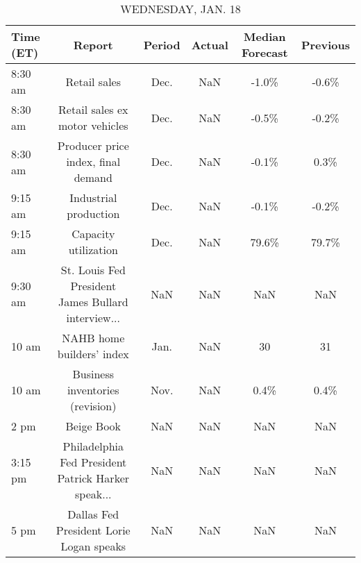 \documentclass{article}%
\begin{document}
\begin{table}[htbp]%
\caption{WEDNESDAY, JAN. 18}%
\centering%
\begin{adjustbox}{width=1\textwidth}%
\begin{tabular}{lccccc}
\toprule
Time (ET) &                                             Report & Period & Actual & Median Forecast & Previous \\
\midrule
  8:30 am &                                       Retail sales &   Dec. &    NaN &           -1.0\% &    -0.6\% \\
  8:30 am &                     Retail sales ex motor vehicles &   Dec. &    NaN &           -0.5\% &    -0.2\% \\
  8:30 am &                 Producer price index, final demand &   Dec. &    NaN &           -0.1\% &     0.3\% \\
  9:15 am &                              Industrial production &   Dec. &    NaN &           -0.1\% &    -0.2\% \\
  9:15 am &                               Capacity utilization &   Dec. &    NaN &           79.6\% &    79.7\% \\
  9:30 am & St. Louis Fed President James Bullard interview... &    NaN &    NaN &             NaN &      NaN \\
    10 am &                          NAHB home builders' index &   Jan. &    NaN &              30 &       31 \\
    10 am &                    Business inventories (revision) &   Nov. &    NaN &            0.4\% &     0.4\% \\
     2 pm &                                         Beige Book &    NaN &    NaN &             NaN &      NaN \\
  3:15 pm & Philadelphia Fed President Patrick Harker speak... &    NaN &    NaN &             NaN &      NaN \\
     5 pm &            Dallas Fed President Lorie Logan speaks &    NaN &    NaN &             NaN &      NaN \\
\bottomrule
\end{tabular}
%
\end{adjustbox}%
\end{table}

%
\end{document}
